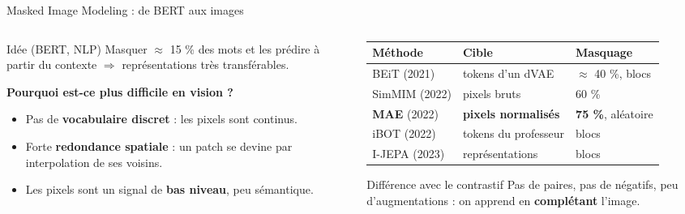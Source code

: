 \documentclass[aspectratio=169,10pt]{beamer}
\newcommand{\src}[1]{\par\vfill\hfill{\tiny\color{grisE}#1}}
\begin{document}
\begin{frame}{Masked Image Modeling : de BERT aux images}
  \begin{columns}[T]
    \begin{column}{0.47\textwidth}
      \begin{block}{Idée (BERT, NLP)}
        \small Masquer $\approx$ 15 \% des mots et les prédire à partir du contexte $\Rightarrow$ représentations très transférables.
      \end{block}
      \textbf{Pourquoi est-ce plus difficile en vision ?}
      \begin{itemize}\small
        \item Pas de \textbf{vocabulaire discret} : les pixels sont continus.
        \item Forte \textbf{redondance spatiale} : un patch se devine par interpolation de ses voisins.
        \item Les pixels sont un signal de \textbf{bas niveau}, peu sémantique.
      \end{itemize}
    \end{column}
    \begin{column}{0.5\textwidth}
      \footnotesize
      \begin{tabular}{@{}l l l@{}}
        \toprule
        \textbf{Méthode} & \textbf{Cible} & \textbf{Masquage}\\
        \midrule
        BEiT (2021) & tokens d'un dVAE & $\approx$ 40 \%, blocs\\
        SimMIM (2022) & pixels bruts & 60 \%\\
        \textbf{MAE} (2022) & \textbf{pixels normalisés} & \textbf{75 \%}, aléatoire\\
        iBOT (2022) & tokens du professeur & blocs\\
        I-JEPA (2023) & représentations & blocs\\
        \bottomrule
      \end{tabular}
      \vspace{3mm}
      \begin{exampleblock}{Différence avec le contrastif}
        \footnotesize Pas de paires, pas de négatifs, peu d'augmentations : on apprend en \textbf{complétant} l'image.
      \end{exampleblock}
    \end{column}
  \end{columns}
  \src{\citet{devlin2019bert,bao2022beit,xie2022simmim,zhou2022ibot,assran2023ijepa}}
\end{frame}
\end{document}
